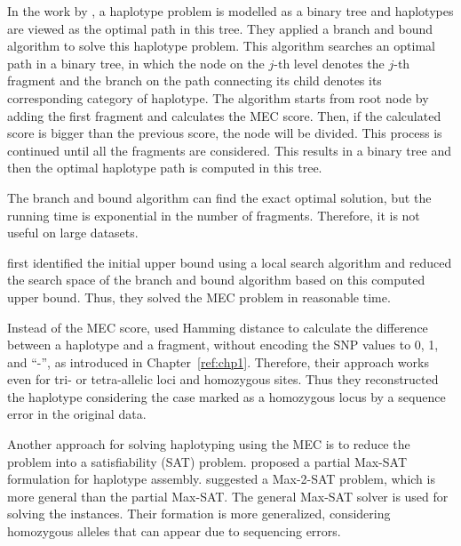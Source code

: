 In the work by \cite{wang2005haplotype}, a haplotype problem is modelled as a binary tree and haplotypes are viewed as the optimal path in this tree. 
They applied a branch
and bound algorithm to solve this haplotype problem. 
This algorithm searches an optimal path in a binary tree, in which
the node on the $j$-th level denotes the $j$-th fragment and the
branch on the path connecting its child denotes its
corresponding category of haplotype. The algorithm starts from root node by adding the first fragment and calculates the MEC score. 
Then, if the calculated score is bigger than the previous score, the node will be divided. This process is continued until all the fragments are considered.
This results in a binary tree and then the optimal haplotype path is computed in this tree.

The branch and bound algorithm
can find the exact optimal solution, but the running time is exponential in the number of
fragments. Therefore, it is not useful on large datasets. 

\cite{lim2012individual} first identified the initial upper bound using a local search algorithm and 
reduced the search space of the branch and bound algorithm based on this computed upper bound.
Thus, they solved the MEC problem in reasonable time.

Instead of the MEC score, \cite{wang2012using} used Hamming distance to calculate the difference between a haplotype and a fragment, 
without encoding the SNP values to 0, 1, and ``-'', as introduced in Chapter~\ref{ref:chp1}. 
Therefore, their  approach works even for tri- or tetra-allelic loci and homozygous sites. 
Thus they reconstructed the haplotype considering the case marked as a homozygous locus by a sequence error in the original data. 

Another approach for solving haplotyping using the MEC is to reduce the problem into a satisfiability (SAT) problem. 
\cite{he2010optimal} proposed a partial Max-SAT formulation for haplotype assembly. 
\cite{mousavi2011effective} suggested a Max-2-SAT problem,
which is more general than the partial Max-SAT. The general Max-SAT solver is used for solving the instances. Their formation is more generalized, 
considering homozygous alleles that can appear due to sequencing errors.

